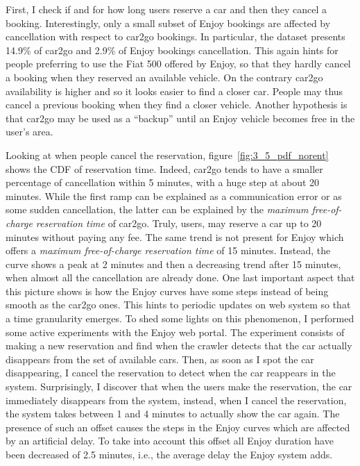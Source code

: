 First, I check if and for how long users reserve a car and then they cancel a booking. Interestingly, only a small subset of Enjoy bookings are affected by cancellation with respect to car2go bookings. In particular, the dataset presents 14.9\% of car2go and 2.9\% of Enjoy bookings cancellation. This again hints for people preferring to use the Fiat 500 offered by Enjoy, so that they hardly cancel a booking when they reserved an available vehicle. On the contrary car2go availability is higher and so it looks easier to find a closer car. People may thus cancel a previous booking when they find a closer vehicle. Another hypothesis is that car2go may be used as a ``backup'' until an Enjoy vehicle becomes free in the user's area. 

Looking at when people cancel the reservation, figure~\ref{fig:3_5_pdf_norent} shows the CDF of reservation time. Indeed, car2go tends to have a smaller percentage of cancellation within 5 minutes, with a huge step at about 20 minutes. While the first ramp can be explained as a communication error or as some sudden cancellation, the latter can be explained by the \textit{maximum free-of-charge reservation time} of car2go. Truly, users, may reserve a car up to 20 minutes without paying any fee. The same trend is not present for Enjoy which offers a \textit{maximum free-of-charge reservation time} of 15 minutes. Instead, the curve shows a peak at 2 minutes and then a decreasing trend after 15 minutes, when almost all the cancellation are already done.
One last important aspect that this picture shows is how the Enjoy curves have some steps instead of being smooth as the car2go ones. 
This hints to periodic updates on web system so that a time granularity emerges.
To shed some lights on this phenomenon, I performed some active experiments with the Enjoy web portal. The experiment consists of making a new reservation and find when the crawler detects that the car actually disappears from the set of available cars. Then, as soon as I spot the car disappearing, I cancel the reservation to detect when the car reappears in the system. Surprisingly, I discover that when the users make the reservation, the car immediately disappears from the system, instead, when I cancel the reservation, the system takes between 1 and 4 minutes to actually show the car again. The presence of such an offset causes the steps in the Enjoy curves which are affected by an artificial delay. To take into account this offset all Enjoy duration have been decreased of 2.5 minutes, i.e., the average delay the Enjoy system adds. 



